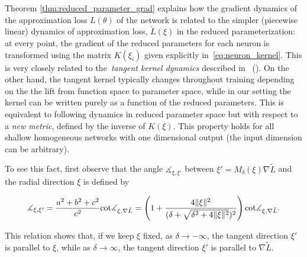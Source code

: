 Theorem \ref{thm:reduced_parameter_grad} explains how the gradient dynamics of the approximation loss $L(\theta)$ of the network is related to the simpler (piecewise linear) dynamics of approximation loss, $\tilde{L}(\xi)$ in the reduced parameterization: at every point, the gradient of the reduced parameters for each neuron is transformed using the matrix $K(\xi_i)$ given explicitly in~\eqref{eq:neuron_kernel}. This is very closely related to the~\emph{tangent kernel dynamics} described in~ \cite{NTKJacot} (). On the other hand, the tangent kernel typically changes throughout training depending on the the lift from function space to parameter space, while in our setting the kernel can be written purely as a function of the reduced parameters. This is equivalent to following dynamics in reduced parameter space but with respect to a \emph{new metric}, defined by the inverse of $K(\xi)$. This property holds for all shallow homogeneous networks with one dimensional output (the input dimension can be arbitrary).



To see this fact, first observe that the angle $\measuredangle_{\xi,\xi'}$ between $\xi' = M_\delta(\xi) \nabla \tilde{L}$ and the radial direction $\xi$ is defined by

\begin{equation}
    \measuredangle_{\xi,\xi'} = \frac{a^2 + b^2 + c^2}{c^2} {\rm cot} \measuredangle_{\xi,\nabla \tilde{L}}= \left(1 + \frac{4\|\xi\|^2}{(\delta + \sqrt{\delta^2 + 4 \|\xi\|^2})^2}\right) {\rm cot} \measuredangle_{\xi,\nabla \tilde{L}}.
\end{equation}

This relation shows that, if we keep $\xi$ fixed, as $\delta \rightarrow -\infty$, the tangent direction $\xi'$ is parallel to $\xi$, while as $\delta \rightarrow \infty$, the tangent direction $\xi'$ is parallel to $\nabla \tilde{L}$.